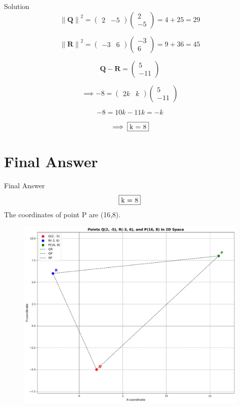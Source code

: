 \documentclass{beamer}
\let\vec\mathbf
\theoremstyle{remark}
\providecommand{\norm}[1]{\lVert#1\rVert}
\newcommand{\myvec}[1]{\ensuremath{\begin{pmatrix}#1\end{pmatrix}}}
\begin{document}
\begin{frame}{Solution}
\begin{equation*}
    {\norm{\vec{Q}}}^2 = \myvec{2&-5}\myvec{2\\-5} = 4+25 = 29
\end{equation*}

\begin{equation*}
    {\norm{\vec{R}}}^2 = \myvec{-3&6}\myvec{-3\\6} = 9+36 = 45
\end{equation*}

\begin{equation*}
    \vec{Q} - \vec{R} = \myvec{5\\-11}
\end{equation*}

\begin{equation}
    \implies -8 = \myvec{2k&k}\myvec{5\\-11}
\end{equation}

\begin{equation}
    -8 = 10k - 11k = -k
\end{equation}

\begin{equation}
    \implies \fbox{k = 8}
\end{equation}

\end{frame}

\section{Final Answer}
\begin{frame}{Final Answer}
\begin{equation*}
    \fbox{k = 8}
\end{equation*}
The coordinates of point P are (16,8).

\begin{figure}
    \centering
    \includegraphics[width=0.5\linewidth]{figs/1.jpg}
\end{figure}

\end{frame}
\end{document}
